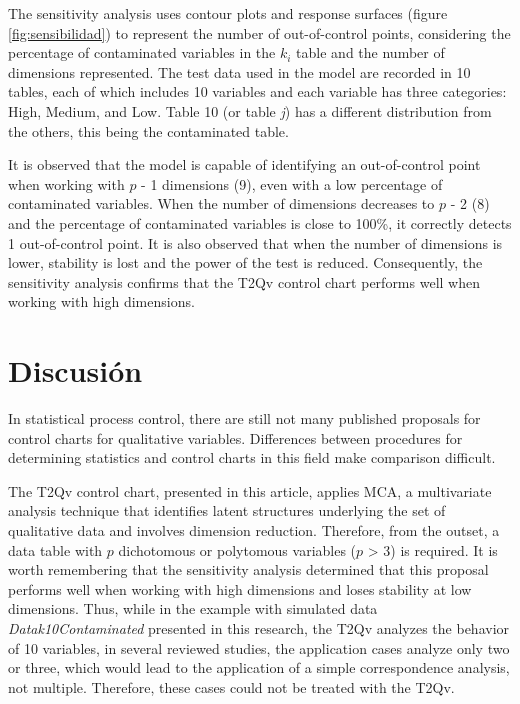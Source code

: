 \documentclass[mathematics,article,submit,moreauthors,pdftex]{mdpi}
\begin{document}
The sensitivity analysis uses contour plots and response surfaces
(figure \ref{fig:sensibilidad}) to represent the number of
out-of-control points, considering the percentage of contaminated
variables in the \(k_i\) table and the number of dimensions represented.
The test data used in the model are recorded in 10 tables, each of which
includes 10 variables and each variable has three categories: High,
Medium, and Low. Table 10 (or table \emph{j}) has a different
distribution from the others, this being the contaminated table.

It is observed that the model is capable of identifying an
out-of-control point when working with \(p\) - 1 dimensions (9), even
with a low percentage of contaminated variables. When the number of
dimensions decreases to \(p\) - 2 (8) and the percentage of contaminated
variables is close to 100\%, it correctly detects 1 out-of-control
point. It is also observed that when the number of dimensions is lower,
stability is lost and the power of the test is reduced. Consequently,
the sensitivity analysis confirms that the T2Qv control chart performs
well when working with high dimensions.

\hypertarget{discusiuxf3n}{%
\section{Discusión}\label{discusiuxf3n}}

In statistical process control, there are still not many published
proposals for control charts for qualitative variables. Differences
between procedures for determining statistics and control charts in this
field make comparison difficult.

The T2Qv control chart, presented in this article, applies MCA, a
multivariate analysis technique that identifies latent structures
underlying the set of qualitative data and involves dimension reduction.
Therefore, from the outset, a data table with \(p\) dichotomous or
polytomous variables (\(p\) \textgreater{} 3) is required. It is worth
remembering that the sensitivity analysis determined that this proposal
performs well when working with high dimensions and loses stability at
low dimensions. Thus, while in the example with simulated data
\emph{Datak10Contaminated} presented in this research, the T2Qv analyzes
the behavior of 10 variables, in several reviewed studies, the
application cases analyze only two or three, which would lead to the
application of a simple correspondence analysis, not multiple.
Therefore, these cases could not be treated with the T2Qv.
\end{document}
